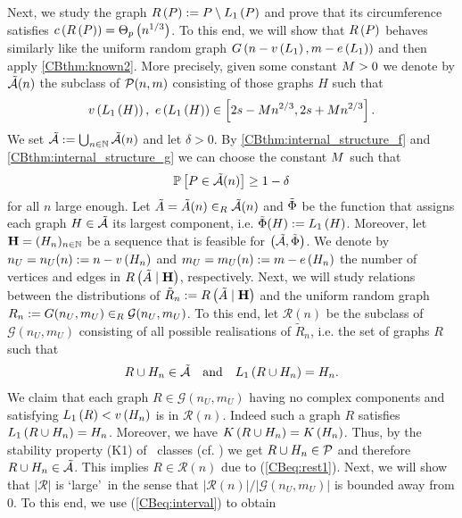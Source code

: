 Next, we study the graph $R\left(P\right):=P \setminus L_1\left(P\right)$ and prove that its circumference satisfies $c\left({R\left(P\right)}\right)=\Theta_p\left(n^{1/3}\right)$. To this end, we will show that $R\left(P\right)$ behaves similarly like the uniform random graph $G\left(n-v\left({L_1}\right), m-e\left({L_1}\right)\right)$ and then apply \ref{CBthm:known2}. More precisely, given some constant $M>0$ we denote by $\tilde{\mathcal{A}}(n)$ the subclass of $\mathcal{P}(n,m)$ consisting of those graphs $H$ such that 
\begin{align}\label{CBeq:interval}
\numberVertices{\largestComponent{H}},\ \numberEdges{\largestComponent{H}} \in \left[2s-\constant n^{2/3}, 2s+\constant n^{2/3}\right].
\end{align}
We set $\tilde{\mathcal{A}}:=\bigcup_{n\in\mathbb{N}} \tilde{\mathcal{A}}(n)$ and let $\delta>0$. By \ref{CBthm:internal_structure_f} and \ref{CBthm:internal_structure_g} we can choose the constant $M$ such that 
\begin{align}\label{CBeq:rest}
\mathbb{P}\left[P\in \tilde{\mathcal{A}}(n)\right]\geq 1-\delta
\end{align}
for all $n$ large enough. Let $\tilde{A}=\tilde{A}(n)\in_R \tilde{\mathcal{A}}(n)$ and $\tilde{\Phi}$ be the function that assigns each graph $H \in \tilde{\mathcal{A}}$ its largest component, i.e. $\tilde{\Phi}(H):=L_1\left(H\right)$. Moreover, let $\mathbf{H}=(H_n)_{n\in\mathbb{N}}$ be a sequence that is feasible for $\left(\tilde{\mathcal{A}}, \tilde{\Phi}\right)$. We denote by $n_U=n_U(n):=n-v\left({H_n}\right)$ and $m_U=m_U(n):=m-e\left({H_n}\right)$ the number of vertices and edges in $R\left(\tilde{A} \mid \mathbf{H}\right)$, respectively. Next, we will study relations between the distributions of $\tilde{R}_n:=R\left(\tilde{A} \mid \mathbf{H}\right)$ and the uniform random graph $R_n:=G(n_U, m_U)\in_R \mathcal G(n_U, m_U)$. To this end, let $\mathcal{R}(n)$ be the subclass of $\mathcal{G}(n_U,m_U)$ consisting of all possible realisations of $\tilde{R}_n$, i.e. the set of graphs $R$ such that 
\begin{align}\label{CBeq:rest1}
R\cup H_n \in \tilde{\mathcal{A}} \quad \text{and} \quad L_1\left(R\cup H_n\right)=H_n.
\end{align}
We claim that each graph $R\in \mathcal{G}(n_U,m_U)$ having no complex components and satisfying $L_1\left(R\right)<v\left({H_n}\right)$ is in $\mathcal{R}(n)$. Indeed such a graph $R$ satisfies $L_1\left(R\cup H_n\right)=H_n$. Moreover, we have $K\left(R\cup H_n\right)=K\left(H_n\right)$. Thus, by the stability property (K1) of \pl\ classes (cf. ) we get $R\cup H_n \in \mathcal{P}$ and therefore $R\cup H_n \in \tilde{\mathcal{A}}$. This implies $R\in \mathcal{R}(n)$ due to (\ref{CBeq:rest1}). Next, we will show that $|\mathcal{R}|$ is \lq large\rq\ in the sense that $\left|\mathcal{R}(n)\right|/\left|\mathcal{G}(n_U,m_U)\right|$ is bounded away from 0. To this end, we use (\ref{CBeq:interval}) to obtain
